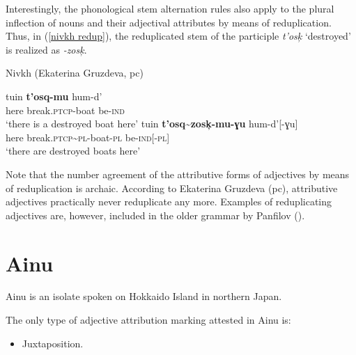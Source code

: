 Interestingly, the phonological stem alternation rules also apply to the plural inflection of nouns and their adjectival attributes by means of reduplication. Thus, in (\ref{nivkh redup}), the reduplicated stem of the participle \textit{t'osk̦} ‘destroyed’ is realized as \textit{-zosk̦}.
\begin{exe}
\ex \label{nivkh redup}
\rm{Nivkh (Ekaterina Gruzdeva, pc)}
\begin{xlist}
\ex 
\gll	tuin \textbf{t'osq-mu} hum-d'\\
	here break.\textsc{ptcp}-boat be-\textsc{ind}\\
\glt	‘there is a destroyed boat here’ 
\ex \label{nivkh unaltered}
\gll	tuin \textbf{t'osq\textasciitilde zosk̦-mu-ɣu} hum-d'[-ɣu]\\
	here break.\textsc{ptcp}\textasciitilde \textsc{pl}-boat-\textsc{pl} be-\textsc{ind}[-\textsc{pl}]\\
\glt	‘there are destroyed boats here’
\end{xlist}
\end{exe}
Note that the number agreement of the attributive forms of adjectives by means of reduplication is archaic. According to Ekaterina Gruzdeva (pc), attributive adjectives practically never reduplicate any more. Examples of reduplicating adjectives are, however, included in the older grammar by Panfilov (\citeyear{panfilov1965}).

\section{Ainu}
Ainu is an isolate spoken on Hokkaido Island in northern Japan.

The only type of adjective attribution marking attested in Ainu is:
\begin{itemize}
\item Juxtaposition.
\end{itemize}

